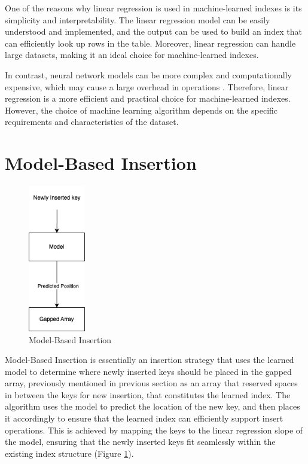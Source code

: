 One of the reasons why linear regression is used in machine-learned indexes is its simplicity and interpretability. The linear regression model can be easily understood and implemented, and the output can be used to build an index that can efficiently look up rows in the table. Moreover, linear regression can handle large datasets, making it an ideal choice for machine-learned indexes.

In contrast, neural network models can be more complex and computationally expensive, which may cause a large overhead in operations \cite{CasedLearnedIndex}. Therefore, linear regression is a more efficient and practical choice for machine-learned indexes. However, the choice of machine learning algorithm depends on the specific requirements and characteristics of the dataset.

\section{Model-Based Insertion}
\begin{figure}
    \centering
    \includegraphics[width=25mm,scale=0.5]{Figures/ModelBasedInsert.png}
    \caption{
     Model-Based Insertion
    }
    \label{fig:model-basedinsertion}
\end{figure}
Model-Based Insertion is essentially an insertion strategy that uses the learned model to determine where newly inserted keys should be placed in the gapped array, previously mentioned in previous section as an array that reserved spaces in between the keys for new insertion, that constitutes the learned index. The algorithm uses the model to predict the location of the new key, and then places it accordingly to ensure that the learned index can efficiently support insert operations. This is achieved by mapping the keys to the linear regression slope of the model, ensuring that the newly inserted keys fit seamlessly within the existing index structure (Figure \ref{fig:model-basedinsertion}).


